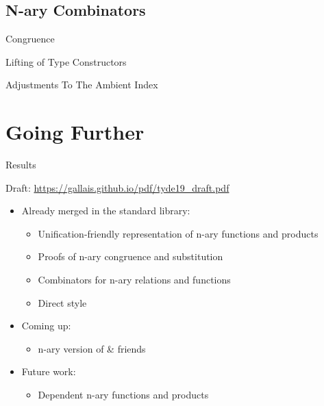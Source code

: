 \documentclass[compress,9pt]{beamer}
\begin{document}
\subsection{N-ary Combinators}

\begin{frame}{Congruence}
\end{frame}

\begin{frame}{Lifting of Type Constructors}
\end{frame}

\begin{frame}{Adjustments To The Ambient Index}
\end{frame}


\section{Going Further}

\begin{frame}{Results}

  Draft: {\large\url{https://gallais.github.io/pdf/tyde19_draft.pdf}}
  \bigskip

  \begin{itemize}
    \item Already merged in the standard library:
    \begin{itemize}
      \item Unification-friendly representation of n-ary functions and products
      \item Proofs of n-ary congruence and substitution
      \item Combinators for n-ary relations and functions
      \item Direct style 
    \end{itemize}
    \bigskip
    \item Coming up:
    \begin{itemize}
      \item n-ary version of  \& friends
    \end{itemize}
    \bigskip
    \item Future work:
    \begin{itemize}
      \item Dependent n-ary functions and products
    \end{itemize}
  \end{itemize}
\end{frame}
\end{document}
